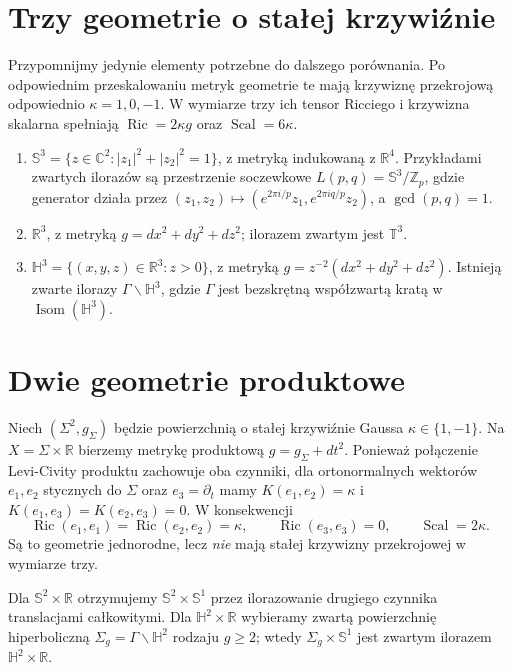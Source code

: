 \section{Trzy geometrie o stałej krzywiźnie}

Przypomnijmy jedynie elementy potrzebne do dalszego porównania. Po
odpowiednim przeskalowaniu metryk geometrie te mają krzywiznę
przekrojową odpowiednio $\kappa=1,0,-1$. W wymiarze trzy ich
tensor Ricciego i krzywizna skalarna spełniają
$\operatorname{Ric}=2\kappa g$ oraz $\operatorname{Scal}=6\kappa$.

\begin{przyklad}
\begin{enumerate}
\item $\mathbb S^3=\{z\in\mathbb C^2:|z_1|^2+|z_2|^2=1\}$,
      z metryką indukowaną z $\mathbb R^4$. Przykładami zwartych
      ilorazów są przestrzenie soczewkowe
      $L(p,q)=\mathbb S^3/\mathbb Z_p$, gdzie generator działa przez
      $(z_1,z_2)\mapsto(e^{2\pi i/p}z_1,e^{2\pi iq/p}z_2)$,
      a $\gcd(p,q)=1$.
\item $\mathbb R^3$, z metryką $g=dx^2+dy^2+dz^2$;
      ilorazem zwartym jest $\mathbb T^3$.
\item $\mathbb H^3=\{(x,y,z)\in\mathbb R^3:z>0\}$,
      z metryką $g=z^{-2}(dx^2+dy^2+dz^2)$. Istnieją zwarte ilorazy
      $\Gamma\backslash\mathbb H^3$, gdzie $\Gamma$ jest bezskrętną
      współzwartą kratą w $\operatorname{Isom}(\mathbb H^3)$.
\end{enumerate}
\end{przyklad}

\section{Dwie geometrie produktowe}

Niech $(\Sigma^2,g_\Sigma)$ będzie powierzchnią o stałej krzywiźnie
Gaussa $\kappa\in\{1,-1\}$. Na $X=\Sigma\times\mathbb R$ bierzemy
metrykę produktową $g=g_\Sigma+dt^2$. Ponieważ połączenie
Levi-Civity produktu zachowuje oba czynniki, dla ortonormalnych
wektorów $e_1,e_2$ stycznych do $\Sigma$ oraz $e_3=\partial_t$
mamy $K(e_1,e_2)=\kappa$ i $K(e_1,e_3)=K(e_2,e_3)=0$.
W konsekwencji
\[
\operatorname{Ric}(e_1,e_1)=\operatorname{Ric}(e_2,e_2)=\kappa,
\qquad \operatorname{Ric}(e_3,e_3)=0,
\qquad \operatorname{Scal}=2\kappa.
\]
Są to geometrie jednorodne, lecz \emph{nie} mają stałej krzywizny
przekrojowej w wymiarze trzy.

\begin{przyklad}
Dla $\mathbb S^2\times\mathbb R$ otrzymujemy
$\mathbb S^2\times\mathbb S^1$ przez ilorazowanie drugiego czynnika
translacjami całkowitymi. Dla $\mathbb H^2\times\mathbb R$ wybieramy
zwartą powierzchnię hiperboliczną $\Sigma_g=\Gamma\backslash\mathbb H^2$
rodzaju $g\ge2$; wtedy $\Sigma_g\times\mathbb S^1$ jest zwartym
ilorazem $\mathbb H^2\times\mathbb R$.
\end{przyklad}

